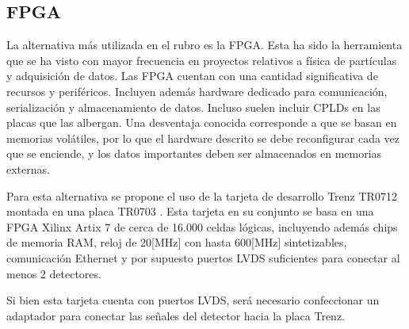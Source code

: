 %
%

\newpage
\subsection{FPGA}
La alternativa más utilizada en el rubro es la FPGA. Esta ha sido la herramienta que se ha visto con mayor frecuencia en proyectos relativos a física de partículas y adquisición de datos. 
Las FPGA cuentan con una cantidad significativa de recursos y periféricos. Incluyen además hardware dedicado para comunicación, serialización y almacenamiento de datos. Incluso suelen incluir CPLDs en las placas que las albergan. Una desventaja conocida corresponde a que se basan en memorias volátiles, por lo que el hardware descrito se debe reconfigurar cada vez que se enciende, y los datos importantes deben ser almacenados en memorias externas.

Para esta alternativa se propone el uso de la tarjeta de desarrollo Trenz TR0712 \cite{TrenzElectronic2019TR07012Wiki} montada en una placa TR0703 \cite{TrenzElectronic2019TR0703Wiki}. Esta tarjeta en su conjunto se basa en una FPGA Xilinx Artix 7 \cite{Xilinx20107DS180} de cerca de 16.000 celdas lógicas, incluyendo además chips de memoria RAM, reloj de 20[MHz] con hasta 600[MHz] sintetizables, comunicación Ethernet y por supuesto puertos LVDS suficientes para conectar al menos 2 detectores.

Si bien esta tarjeta cuenta con puertos LVDS, será necesario confeccionar un adaptador para conectar las señales del detector hacia la placa Trenz.


